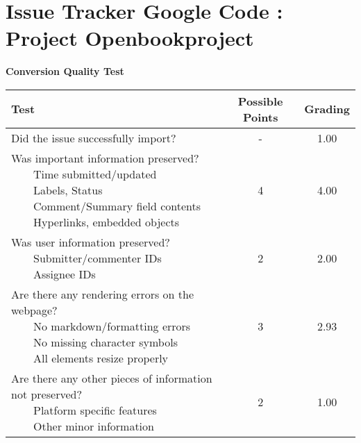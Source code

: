 \documentclass{article}
\newcommand{\tabitem}{~~\llap{\textbullet}~~}
\begin{document}
\\\section{Issue Tracker Google Code : Project Openbookproject}
\textbf{Conversion Quality Test}\\
\begin{adjustbox}{center}
	\renewcommand{\arraystretch}{1.5}
	\begin{tabular}{ p{6cm} | c | c }
		Test & Possible Points & Grading \\ \hline
		Did the issue successfully import? & - & 1.00 \\
		\hline
		\makecell[l]{
			Was important information preserved? \\
			\tabitem Time submitted/updated \\
			\tabitem Labels, Status \\
			\tabitem Comment/Summary field contents \\
			\tabitem Hyperlinks, embedded objects}
		& 4 & 4.00 \\
		\hline
		\makecell[l]{
			Was user information preserved? \\
			\tabitem Submitter/commenter IDs \\
			\tabitem Assignee IDs
		} & 2 & 2.00 \\
		\hline
		\makecell[{{p{6cm}}}]{
			Are there any rendering errors on the webpage? \\
			\tabitem No markdown/formatting errors \\
			\tabitem No missing character symbols \\
			\tabitem All elements resize properly
		} & 3 & 2.93 \\
		\hline
		\makecell[{{p{6cm}}}]{
			Are there any other pieces of information not preserved? \\
			\tabitem Platform specific features \\
			\tabitem Other minor information
		} & 2 & 1.00 \\
	\end{tabular}
\end{adjustbox}
\\
\end{document}

